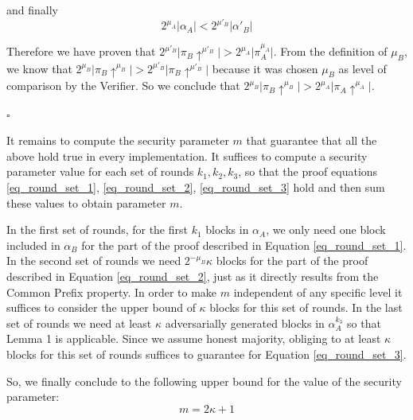 and finally
\begin{equation}
2^{\mu_A} \vert \alpha_A \vert < 2^{\mu'_B} \vert \alpha'{_B} \vert
\end{equation}


Therefore we have proven that $2^{\mu'_B} \vert \pi_B \uparrow^{\mu'_B} \vert >
2^{\mu_A} \vert \pi_A^{\mu_A} \vert$. From the definition of $\mu_B$, we know
that $2^{\mu_B} \vert \pi_B \uparrow^{\mu_B} \vert > 2^{\mu'_B} \vert \pi_B
\uparrow^{\mu'_B} \vert$ because it was chosen $\mu_B$ as level of comparison
by the Verifier. So we conclude that $2^{\mu_B} \vert \pi_B \uparrow^{\mu_B}
\vert > 2^{\mu_A} \vert \pi_A \uparrow^{\mu_A} \vert$.

\begin{flushright}
$\square$
\end{flushright}

It remains to compute the security parameter $m$ that guarantee that all the above
hold true in every implementation. It suffices to compute a security parameter
value for each set of rounds $k_1, k_2, k_3$, so that the proof equations
\ref{eq_round_set_1}, \ref{eq_round_set_2}, \ref{eq_round_set_3} hold and
then sum these values to obtain parameter $m$.

In the first set of rounds, for the first $k_1$ blocks in $\alpha_A$, we only need
one block included in $\alpha_B$ for the part of the proof described in Equation
\ref{eq_round_set_1}. In the second set of rounds we need $2^{-\mu_B}\kappa$ blocks
for the part of the proof described in Equation \ref{eq_round_set_2}, just as it
directly results from the Common Prefix property. In order to make $m$ independent
of any specific level it suffices to consider the upper bound of $\kappa$ blocks
for this set of rounds. In the last set of rounds we need at least $\kappa$
adversarially generated blocks in $\alpha_A^{k_3}$ so that Lemma 1 is applicable.
Since we assume honest majority, obliging to at least $\kappa$ blocks for this
set of rounds suffices to guarantee for Equation \ref{eq_round_set_3}.

So, we finally conclude to the following upper bound for the value of the
 security parameter:
\begin{equation}
m = 2\kappa + 1
\end{equation}
 
